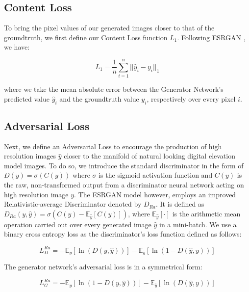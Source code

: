 \documentclass[tc, manuscript]{copernicus}
\begin{document}
\subsection{Content Loss}

To bring the pixel values of our generated images closer to that of the groundtruth, we first define our Content Loss function $L_1$.
Following ESRGAN \citep{WangESRGANEnhancedSuperResolution2018}, we have:

\begin{equation}\label{eq:A1}
  L_1 = \dfrac{1}{n} \sum\limits_{i=1}^n ||\hat{y}_i - y_i||_{1}
\end{equation}

where we take the mean absolute error between the Generator Network's predicted value $\hat{y}_i$ and the groundtruth value $y_i$, respectively over every pixel $i$.

\subsection{Adversarial Loss}

Next, we define an Adversarial Loss to encourage the production of high resolution images $\hat{y}$ closer to the manifold of natural looking digital elevation model images.
To do so, we introduce the standard discriminator in the form of $D(y) = \sigma(C(y))$ where $\sigma$ is the sigmoid activation function and $C(y)$ is the raw, non-transformed output from a discriminator neural network acting on high resolution image $y$.
The ESRGAN model \citep{WangESRGANEnhancedSuperResolution2018} however, employs an improved Relativistic-average Discriminator \citep{Jolicoeur-Martineaurelativisticdiscriminatorkey2018} denoted by $D_{Ra}$.
It is defined as $D_{Ra}(y,\hat{y}) = \sigma(C(y) - \mathbb{E}_{\hat{y}}[C(\hat{y})])$, where $\mathbb{E}_{\hat{y}}[\cdot]$ is the arithmetic mean operation carried out over every generated image $\hat{y}$ in a mini-batch.
We use a binary cross entropy loss as the discriminator's loss function defined as follows:

\begin{equation}\label{eq:A2}
  L_D^{Ra} = - \mathbb{E}_y[\ln(D(y,\hat{y}))] - \mathbb{E}_{\hat{y}}[\ln(1 - D(\hat{y},y))]
\end{equation}

The generator network's adversarial loss is in a symmetrical form:

\begin{equation}\label{eq:A3}
  L_G^{Ra} = - \mathbb{E}_y[\ln(1 - D(y,\hat{y}))] - \mathbb{E}_{\hat{y}}[\ln(D(\hat{y},y))]
\end{equation}
\end{document}
